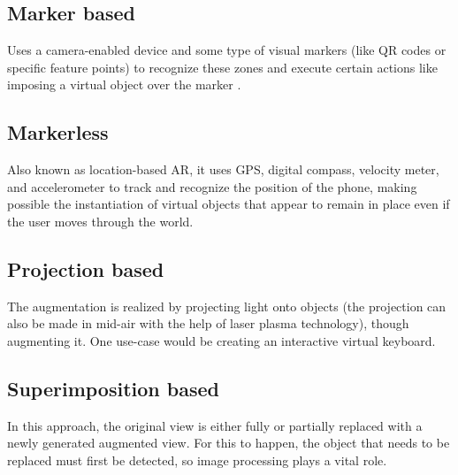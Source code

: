 \documentclass[12 pct]{report}
\begin{document}
\subsection*{Marker based}
Uses a camera-enabled device and some type of visual markers (like QR codes or specific feature points) to recognize these zones and execute certain actions like imposing a virtual object over the marker \cite{wagner2003first}  .
 
\subsection*{Markerless}
Also known as location-based AR, it uses GPS, digital compass, velocity meter, and accelerometer to track and recognize the position of the phone, making possible the instantiation of virtual objects that appear to remain in place even if the user moves through the world.

\subsection*{Projection based}
The augmentation is realized by projecting light onto objects (the projection can also be made in mid-air with the help of laser plasma technology), though augmenting it. One use-case would be creating an interactive virtual keyboard.


\subsection*{Superimposition based}
In this approach, the original view is either fully or partially replaced with a newly generated augmented view. For this to happen, the object that needs to be replaced must first be detected, so image processing plays a vital role.
\end{document}
